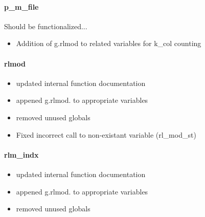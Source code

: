 \documentclass[12pt]{article}
\begin{document}
\paragraph{p\_m\_file}
Should be functionalized...
	\begin{itemize}
		\item Addition of g.rlmod to related variables for k\_col counting
	\end{itemize}

\paragraph{rlmod}

	\begin{itemize}
		\item updated internal function documentation
		\item appened g.rlmod. to appropriate variables
		\item removed unused globals
		\item Fixed incorrect call to non-existant variable (rl\_mod\_st)
	\end{itemize}

\paragraph{rlm\_indx}

	\begin{itemize}
		\item updated internal function documentation
		\item appened g.rlmod. to appropriate variables
		\item removed unused globals

	\end{itemize}
\end{document}
